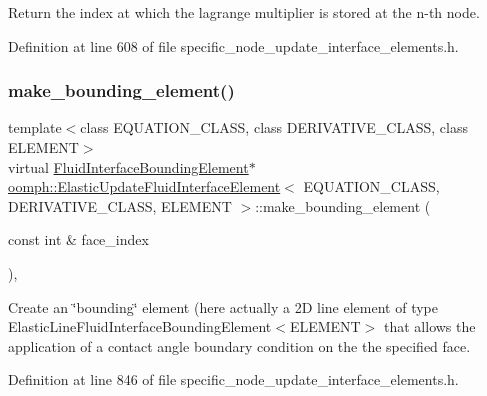 Return the index at which the lagrange multiplier is stored at the n-\/th node. 



Definition at line 608 of file specific\+\_\+node\+\_\+update\+\_\+interface\+\_\+elements.\+h.

\mbox{\label{classoomph_1_1ElasticUpdateFluidInterfaceElement_a91c59905720a4417447fcce09032ce7f}} 
\subsubsection{\texorpdfstring{make\+\_\+bounding\+\_\+element()}{make\_bounding\_element()}}
{\footnotesize\ttfamily template$<$class E\+Q\+U\+A\+T\+I\+O\+N\+\_\+\+C\+L\+A\+SS, class D\+E\+R\+I\+V\+A\+T\+I\+V\+E\+\_\+\+C\+L\+A\+SS, class E\+L\+E\+M\+E\+NT$>$ \\
virtual \hyperlink{classoomph_1_1FluidInterfaceBoundingElement}{Fluid\+Interface\+Bounding\+Element}$\ast$ \hyperlink{classoomph_1_1ElasticUpdateFluidInterfaceElement}{oomph\+::\+Elastic\+Update\+Fluid\+Interface\+Element}$<$ E\+Q\+U\+A\+T\+I\+O\+N\+\_\+\+C\+L\+A\+SS, D\+E\+R\+I\+V\+A\+T\+I\+V\+E\+\_\+\+C\+L\+A\+SS, E\+L\+E\+M\+E\+NT $>$\+::make\+\_\+bounding\+\_\+element (\begin{DoxyParamCaption}\item[{const int \&}]{face\+\_\+index }\end{DoxyParamCaption})\hspace{0.3cm}{\ttfamily [inline]}, {\ttfamily [virtual]}}



Create an \char`\"{}bounding\char`\"{} element (here actually a 2D line element of type Elastic\+Line\+Fluid\+Interface\+Bounding\+Element$<$\+E\+L\+E\+M\+E\+N\+T$>$ that allows the application of a contact angle boundary condition on the the specified face. 



Definition at line 846 of file specific\+\_\+node\+\_\+update\+\_\+interface\+\_\+elements.\+h.

\mbox{\label{classoomph_1_1ElasticUpdateFluidInterfaceElement_a46b22d178b248355083a3564e4e92eb0}} 
